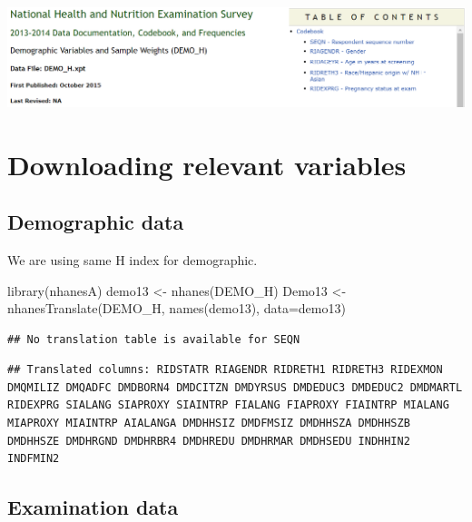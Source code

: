 \documentclass[
]{book}
\newenvironment{Shaded}{\begin{snugshade}}{\end{snugshade}}
\newcommand{\AttributeTok}[1]{\textcolor[rgb]{0.77,0.63,0.00}{#1}}
\newcommand{\FunctionTok}[1]{\textcolor[rgb]{0.00,0.00,0.00}{#1}}
\newcommand{\NormalTok}[1]{#1}
\newcommand{\OtherTok}[1]{\textcolor[rgb]{0.56,0.35,0.01}{#1}}
\newcommand{\StringTok}[1]{\textcolor[rgb]{0.31,0.60,0.02}{#1}}
\begin{document}
\includegraphics[width=0.8\linewidth]{images/demo}

\hypertarget{downloading-relevant-variables}{%
\section{Downloading relevant variables}\label{downloading-relevant-variables}}

\hypertarget{demographic-data}{%
\subsection{Demographic data}\label{demographic-data}}

We are using same H index for demographic.

\begin{Shaded}
\begin{Highlighting}[]
\FunctionTok{library}\NormalTok{(nhanesA)}
\NormalTok{demo13 }\OtherTok{\textless{}{-}} \FunctionTok{nhanes}\NormalTok{(}\StringTok{\textquotesingle{}DEMO\_H\textquotesingle{}}\NormalTok{)}
\NormalTok{Demo13 }\OtherTok{\textless{}{-}} \FunctionTok{nhanesTranslate}\NormalTok{(}\StringTok{\textquotesingle{}DEMO\_H\textquotesingle{}}\NormalTok{, }\FunctionTok{names}\NormalTok{(demo13), }\AttributeTok{data=}\NormalTok{demo13)}
\end{Highlighting}
\end{Shaded}

\begin{verbatim}
## No translation table is available for SEQN
\end{verbatim}

\begin{verbatim}
## Translated columns: RIDSTATR RIAGENDR RIDRETH1 RIDRETH3 RIDEXMON DMQMILIZ DMQADFC DMDBORN4 DMDCITZN DMDYRSUS DMDEDUC3 DMDEDUC2 DMDMARTL RIDEXPRG SIALANG SIAPROXY SIAINTRP FIALANG FIAPROXY FIAINTRP MIALANG MIAPROXY MIAINTRP AIALANGA DMDHHSIZ DMDFMSIZ DMDHHSZA DMDHHSZB DMDHHSZE DMDHRGND DMDHRBR4 DMDHREDU DMDHRMAR DMDHSEDU INDHHIN2 INDFMIN2
\end{verbatim}

\hypertarget{examination-data}{%
\subsection{Examination data}\label{examination-data}}
\end{document}
